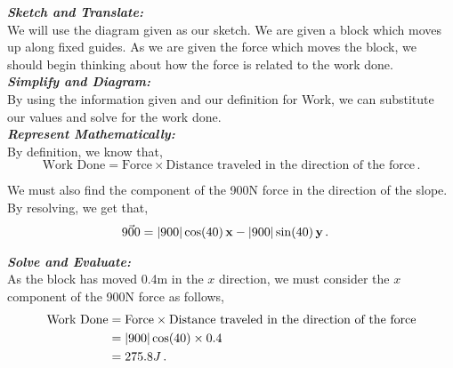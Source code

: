 \begin{subquestions}
\begin{subsubquestions}
\end{subsubquestions}	
	
	
\subquestion

\begin{subsubquestions}

\subsubquestion

\textbf{\textit{Sketch and Translate:}} \\
We will use the diagram given as our sketch. We are given a block which moves up along fixed guides. As we are given the force which moves the block, we should begin thinking about how the force is related to the work done.\\
	
	
\textbf{\textit{Simplify and Diagram:}} \\
By using the information given and our definition for Work, we can substitute our values and solve for the work done.\\




\textbf{\textit{Represent Mathematically:}} \\
By definition, we know that,
\begin{equation}
	\text{Work Done} = \text{Force} \times \text{Distance traveled in the direction of the force} \,.
\end{equation}

We must also find the component of the 900N force in the direction of the slope. By resolving, we get that,
\begin{align}
	\vec{900} & = |900|\cos(40) \,\mathbf{x} -|900|\sin(40) \,\mathbf{y} \,.
\end{align}




\textbf{\textit{Solve and Evaluate:}} \\
As the block has moved 0.4m in the $x$ direction, we must consider the $x$ component of the 900N force as follows,
\begin{align}
	\text{Work Done} & = \text{Force} \times \text{Distance traveled in the direction of the force} \nonumber \\
	                 & = |900|\cos(40) \times 0.4 \nonumber \\
	                 & = 275.8 J \,.
\end{align}


\end{subsubquestions}
\end{subquestions}
